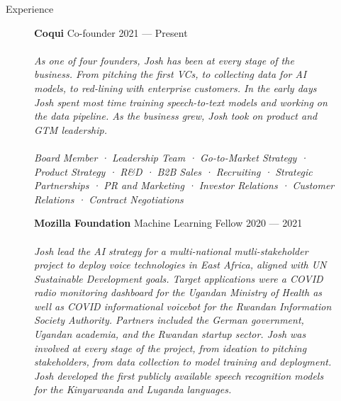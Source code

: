 \documentclass{resume} %
\begin{document}
\begin{rSection}{Experience}

  \begin{figure}[H]
    \begin{minipage}{0.2\textwidth}
      \centering
        
      \end{minipage}
      \begin{minipage}{0.8\textwidth}
          {\bf Coqui} \hfill  Co-founder \hspace{0.5cm} {2021 --- Present} \\ \\
          \textit{As one of four founders, Josh has been at every stage of the business. From pitching the first VCs, to collecting data for AI models, to red-lining with enterprise customers. In the early days Josh spent most time training speech-to-text models and working on the data pipeline. As the business grew, Josh took on product and GTM leadership.} \\ \\
          \textit{Board Member · Leadership Team · Go-to-Market Strategy · Product Strategy · R\&D · B2B Sales · Recruiting · Strategic Partnerships · PR and Marketing · Investor Relations · Customer Relations · Contract Negotiations} \\
      \end{minipage}
  \end{figure}

  \begin{figure}[H]
    \begin{minipage}{0.2\textwidth}
      \centering
      
    \end{minipage}
    \begin{minipage}{0.8\textwidth}
      {\bf Mozilla Foundation} \hfill Machine Learning Fellow \hspace{0.5cm} {2020 --- 2021} \\ \\
      \textit{Josh lead the AI strategy for a multi-national mutli-stakeholder project to deploy voice technologies in East Africa, aligned with UN Sustainable Development goals. Target applications were a COVID radio monitoring dashboard for the Ugandan Ministry of Health as well as COVID informational voicebot for the Rwandan Information Society Authority. Partners included the German government, Ugandan academia, and the Rwandan startup sector. Josh was involved at every stage of the project, from ideation to pitching stakeholders, from data collection to model training and deployment. Josh developed the first publicly available speech recognition models for the Kinyarwanda and Luganda languages.} \\
    \end{minipage}
  \end{figure}


\end{rSection}
\end{document}
